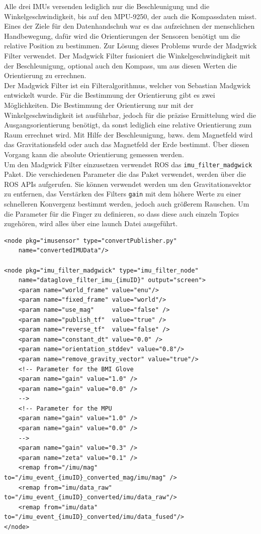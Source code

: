 Alle drei IMUs versenden lediglich nur die Beschleunigung und die Winkelgeschwindigkeit, bis auf den MPU-9250, der auch die Kompassdaten misst. Eines der Ziele für den Datenhandschuh war es das aufzeichnen der menschlichen Handbewegung, dafür wird die Orientierungen der Sensoren benötigt um die relative Position zu bestimmen. Zur Lösung dieses Problems wurde der Madgwick Filter verwendet. Der Madgwick Filter \parencite{Madgwick} fusioniert die Winkelgeschwindigkeit mit der Beschleunigung, optional auch den Kompass, um aus diesen Werten die Orientierung zu errechnen.
\\
Der Madgwick Filter ist ein Filteralgorithmus, welcher von Sebastian Madgwick entwickelt wurde. Für die Bestimmung der Orientierung gibt es zwei Möglichkeiten. 
Die Bestimmung der Orientierung nur mit der Winkelgeschwindigkeit ist ausführbar, jedoch für die präzise Ermittelung wird die Ausgangsorientierung benötigt, da sonst lediglich eine relative Orientierung zum Raum errechnet wird. Mit Hilfe der Beschleunigung, bzws. dem Magnetfeld wird das Gravitationsfeld oder auch das Magnetfeld der Erde bestimmt. Über diesen Vorgang kann die absolute Orientierung gemessen werden.
\\
Um den Madgwick Filter einzusetzen verwendet ROS das \lstinline{imu_filter_madgwick} Paket. Die verschiedenen Parameter die das Paket verwendet, werden über die ROS APIs aufgerufen. Sie können verwendet werden um den Gravitationsvektor zu entfernen, das Verstärken des Filters \lstinline{gain} mit dem höhere Werte zu einer schnelleren Konvergenz bestimmt werden, jedoch auch größerem Rauschen. Um die Parameter für die Finger zu definieren, so dass diese auch einzeln Topics zugehören, wird alles über eine launch Datei ausgeführt.
\\
\begin{lstlisting}
<node pkg="imusensor" type="convertPublisher.py" 
    name="convertedIMUData"/>

<node pkg="imu_filter_madgwick" type="imu_filter_node" 
    name="dataglove_filter_imu_{imuID}" output="screen">
    <param name="world_frame" value="enu"/>
    <param name="fixed_frame" value="world"/>
    <param name="use_mag"     value="false" />
    <param name="publish_tf"  value="true" />
    <param name="reverse_tf"  value="false" />
    <param name="constant_dt" value="0.0" />
    <param name="orientation_stddev" value="0.8"/>
    <param name="remove_gravity_vector" value="true"/>
    <!-- Parameter for the BMI Glove
    <param name="gain" value="1.0" />
    <param name="gain" value="0.0" />
    -->
    <!-- Parameter for the MPU
    <param name="gain" value="1.0" />
    <param name="gain" value="0.0" />
    -->
    <param name="gain" value="0.3" />
    <param name="zeta" value="0.1" />
    <remap from="/imu/mag" to="/imu_event_{imuID}_converted_mag/imu/mag" />
    <remap from="imu/data_raw" to="/imu_event_{imuID}_converted/imu/data_raw"/>
    <remap from="imu/data" to="/imu_event_{imuID}_converted/imu/data_fused"/>
</node>
\end{lstlisting}
